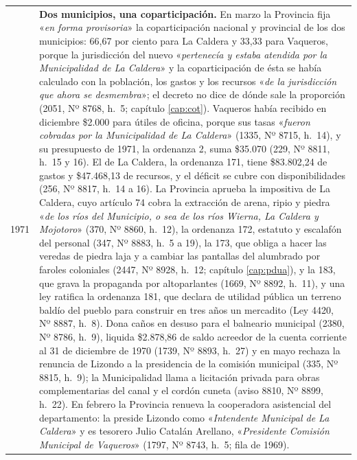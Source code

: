 \begin{longtable}{@{}p{2.7cm}p{10.3cm}@{}}
1971 & \textbf{Dos municipios, una coparticipación.} En marzo la Provincia fija «\textit{en forma provisoria}» la coparticipación nacional y provincial de los dos municipios: 66,67 por ciento para La Caldera y 33,33 para Vaqueros, porque la jurisdicción del nuevo «\textit{pertenecía y estaba atendida por la Municipalidad de La Caldera}» y la coparticipación de ésta se había calculado con la población, los gastos y los recursos «\textit{de la jurisdicción que ahora se desmembra}»; el decreto no dice de dónde sale la proporción (2051, Nº 8768, h.\ 5; capítulo \ref{cap:cot}). Vaqueros había recibido en diciembre \$2.000 para útiles de oficina, porque sus tasas «\textit{fueron cobradas por la Municipalidad de La Caldera}» (1335, Nº 8715, h.\ 14), y su presupuesto de 1971, la ordenanza 2, suma \$35.070 (229, Nº 8811, h.\ 15 y 16). El de La Caldera, la ordenanza 171, tiene \$83.802,24 de gastos y \$47.468,13 de recursos, y el déficit se cubre con disponibilidades (256, Nº 8817, h.\ 14 a 16). La Provincia aprueba la impositiva de La Caldera, cuyo artículo 74 cobra la extracción de arena, ripio y piedra «\textit{de los ríos del Municipio, o sea de los ríos Wierna, La Caldera y Mojotoro}» (370, Nº 8860, h.\ 12), la ordenanza 172, estatuto y escalafón del personal (347, Nº 8883, h.\ 5 a 19), la 173, que obliga a hacer las veredas de piedra laja y a cambiar las pantallas del alumbrado por faroles coloniales (2447, Nº 8928, h.\ 12; capítulo \ref{cap:pdua}), y la 183, que grava la propaganda por altoparlantes (1669, Nº 8892, h.\ 11), y una ley ratifica la ordenanza 181, que declara de utilidad pública un terreno baldío del pueblo para construir en tres años un mercadito (Ley 4420, Nº 8887, h.\ 8). Dona caños en desuso para el balneario municipal (2380, Nº 8786, h.\ 9), liquida \$2.878,86 de saldo acreedor de la cuenta corriente al 31 de diciembre de 1970 (1739, Nº 8893, h.\ 27) y en mayo rechaza la renuncia de Lizondo a la presidencia de la comisión municipal (335, Nº 8815, h.\ 9); la Municipalidad llama a licitación privada para obras complementarias del canal y el cordón cuneta (aviso 8810, Nº 8899, h.\ 22). En febrero la Provincia renueva la cooperadora asistencial del departamento: la preside Lizondo como «\textit{Intendente Municipal de La Caldera}» y es tesorero Julio Catalán Arellano, «\textit{Presidente Comisión Municipal de Vaqueros}» (1797, Nº 8743, h.\ 5; fila de 1969). \\

\end{longtable}
